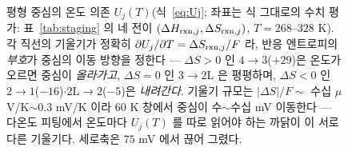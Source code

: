 \begin{figure}[t]
\caption{평형 중심의 온도 의존 $U_j(T)$(식~\eqref{eq:Uj}; 좌표는 식 그대로의 수치 평가: 표~\ref{tab:staging}
의 네 전이 $(\Delta H_{\mathrm{rxn},j},\Delta S_{\mathrm{rxn},j})$, $T{=}268$--$328$ K). 각 직선의 기울기가 정확히
$\partial U_j/\partial T=\Delta S_{\mathrm{rxn},j}/F$ 라, 반응 엔트로피의 \emph{부호}가 중심의 이동 방향을 정한다 ---
$\Delta S{>}0$ 인 $4\!\to\!3$($+29$)은 온도가 오르면 중심이 \emph{올라가고}, $\Delta S{=}0$ 인 $3\!\to\!2\mathrm L$
은 평평하며, $\Delta S{<}0$ 인 $2\!\to\!1$($-16$)$\cdot$$2\mathrm L\!\to\!2$($-5$)은 \emph{내려간다}. 기울기 규모는
$|\Delta S|/F\sim$ 수십 $\mu$V/K$\sim0.3$ mV/K 이라 $60$ K 창에서 중심이 수$\sim$수십 mV 이동한다 --- 다온도
피팅에서 온도마다 $U_j(T)$ 를 따로 읽어야 하는 까닭이 이 서로 다른 기울기다. 세로축은 $75$ mV 에서 끊어
그렸다.}
\label{fig:cand-fo3-4}
\end{figure}
